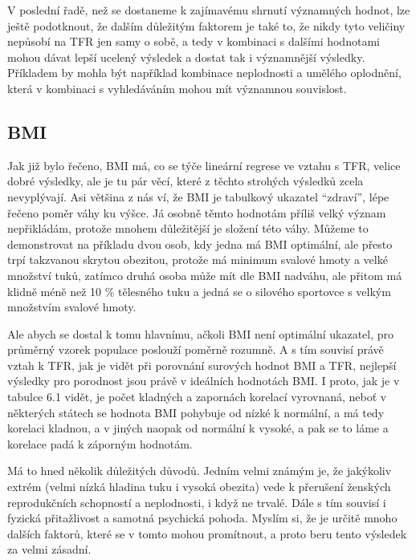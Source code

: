 \documentclass[thesis=M,czech]{FITthesis}[2022/10/08]
\begin{document}
V poslední řadě, než se dostaneme k zajímavému shrnutí významných hodnot, lze ještě podotknout, že dalším důležitým faktorem je také to, že nikdy tyto veličiny nepůsobí na TFR jen samy o sobě, a tedy v kombinaci s dalšími hodnotami mohou dávat lepší ucelený výsledek a dostat tak i významnější výsledky. Příkladem by mohla být například kombinace neplodnosti a umělého oplodnění, která v kombinaci s vyhledáváním mohou mít významnou souvislost.


\subsection{BMI}
Jak již bylo řečeno, BMI má, co se týče lineární regrese ve vztahu s TFR, velice dobré výsledky, ale je tu pár věcí, které z těchto strohých výsledků zcela nevyplývají. Asi většina z nás ví, že BMI je tabulkový ukazatel “zdraví”, lépe řečeno poměr váhy ku výšce. Já osobně těmto hodnotám příliš velký význam nepřikládám, protože mnohem důležitější je složení této váhy. Můžeme to demonstrovat na příkladu dvou osob, kdy jedna má BMI optimální, ale přesto trpí takzvanou skrytou obezitou, protože má minimum svalové hmoty a velké množství tuků, zatímco druhá osoba může mít dle BMI nadváhu, ale přitom má klidně méně než 10 \% tělesného tuku a jedná se o silového sportovce s velkým množstvím svalové hmoty.

Ale abych se dostal k tomu hlavnímu, ačkoli BMI není optimální ukazatel, pro průměrný vzorek populace poslouží poměrně rozumně. A s tím souvisí právě vztah k TFR, jak je vidět při porovnání surových hodnot BMI a TFR, nejlepší výsledky pro porodnost jsou právě v ideálních hodnotách BMI. I proto, jak je v tabulce 6.1 vidět, je počet kladných a zapornách korelací vyrovnaná, neboť v některých státech se hodnota BMI pohybuje od nízké k normální, a má tedy korelaci kladnou, a v jiných naopak od normální k vysoké, a pak se to láme a korelace padá k záporným hodnotám. 

Má to hned několik důležitých důvodů. Jedním velmi známým je, že jakýkoliv extrém (velmi nízká hladina tuku i vysoká obezita) vede k přerušení ženských reprodukčních schopností a neplodnosti, i když ne trvalé. Dále s tím souvisí i fyzická přitažlivost a samotná psychická pohoda. Myslím si, že je určitě mnoho dalších faktorů, které se v tomto mohou promítnout, a proto beru tento výsledek za velmi zásadní. 
\end{document}
